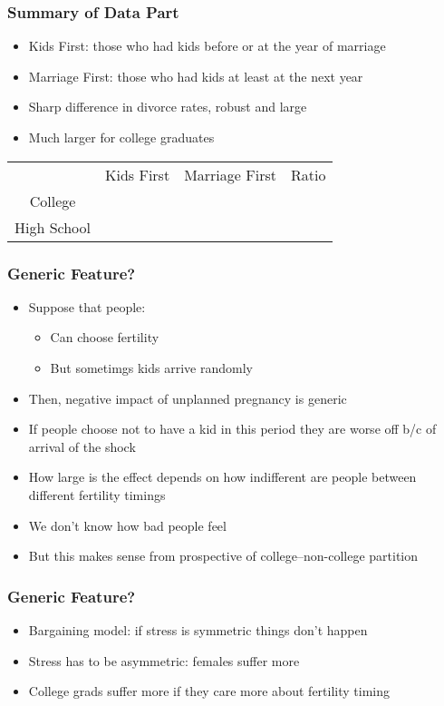 \documentclass{beamer}
\begin{document}
\begin{frame}
\frametitle{Summary of Data Part}
\begin{itemize}
\item Kids First: those who had kids before or at the year of marriage
\item Marriage First: those who had kids at least at the next year
\item Sharp difference in divorce rates, robust and large
\item Much larger for college graduates
\end{itemize}
\begin{center}
\begin{tabular}{|c|c|c|c|}
& Kids First & Marriage First & Ratio \\
College & & & \\
High School & & & \\\hline
\end{tabular}
\end{center}
\end{frame}

\begin{frame}
\frametitle{Generic Feature?}
\begin{itemize}
\item Suppose that people:
\begin{itemize}
\item Can choose fertility 
\item But sometimgs kids arrive randomly
\end{itemize}
\item Then, negative impact of unplanned pregnancy is generic
\item If people choose not to have a kid in this period they are worse off b/c of arrival of the shock
\item How large is the effect depends on how indifferent are people between different fertility timings
\item We don't know how bad people feel
\item But this makes sense from prospective of college--non-college partition
\end{itemize}
\end{frame}



\begin{frame}
\frametitle{Generic Feature?}
\begin{itemize}
\item Bargaining model: if stress is symmetric things don't happen
\item Stress has to be asymmetric: females suffer more
\item College grads suffer more if they care more about fertility timing
\end{itemize}
\end{frame}
\end{document}
